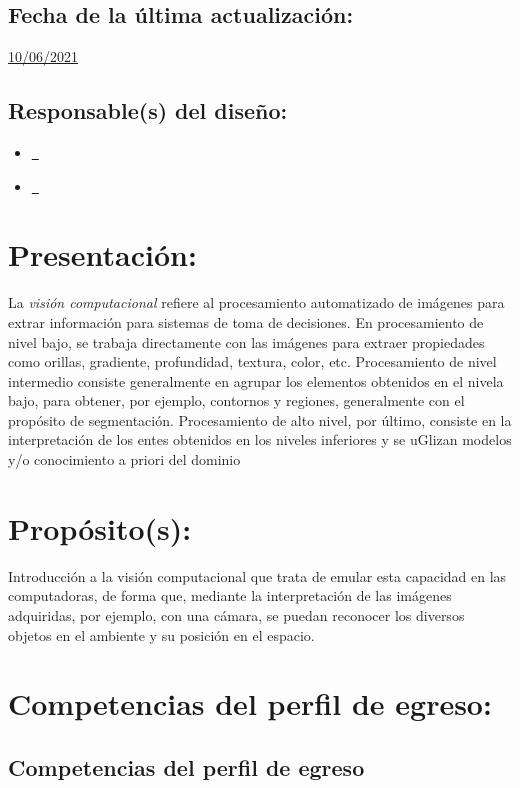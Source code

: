 \documentclass[10 pt]{article}
\begin{document}
\subsection{Fecha de la \'{u}ltima actualizaci\'{o}n:} \underline{10/06/2021}
\subsection{Responsable(s) del dise\~{n}o:}
\begin{itemize}[label={}]
\item \underline{\narturo~\arturo}
\item \underline{\nelisa~\elisa}
\end{itemize}
\newpage
\section{Presentaci\'{o}n:}

La {\em visi\'{o}n computacional} refiere al procesamiento
automatizado de im\'{a}genes para extrar informaci\'{o}n para sistemas
de toma de decisiones.  En procesamiento de nivel bajo, se trabaja
directamente con las im\'{a}genes para extraer propiedades como
orillas, gradiente, profundidad, textura, color, etc. Procesamiento de
nivel intermedio consiste generalmente en agrupar los elementos
obtenidos en el nivela bajo, para obtener, por ejemplo, contornos y
regiones, generalmente con el prop\'{o}sito de
segmentaci\'{o}n. Procesamiento de alto nivel, por \'{u}ltimo,
consiste en la interpretaci\'{o}n de los entes obtenidos en los
niveles inferiores y se uGlizan modelos y/o conocimiento a priori del
dominio

\section{Prop\'{o}sito(s):}

Introducci\'{o}n a la visi\'{o}n computacional que trata de emular esta
capacidad en las computadoras, de forma que, mediante la
interpretaci\'{o}n de las im\'{a}genes adquiridas, por ejemplo, con una
c\'{a}mara, se puedan reconocer los diversos objetos en el ambiente y su
posici\'{o}n en el espacio.

\section{Competencias del perfil de egreso:}
\subsection{Competencias del perfil de egreso}
\end{document}
